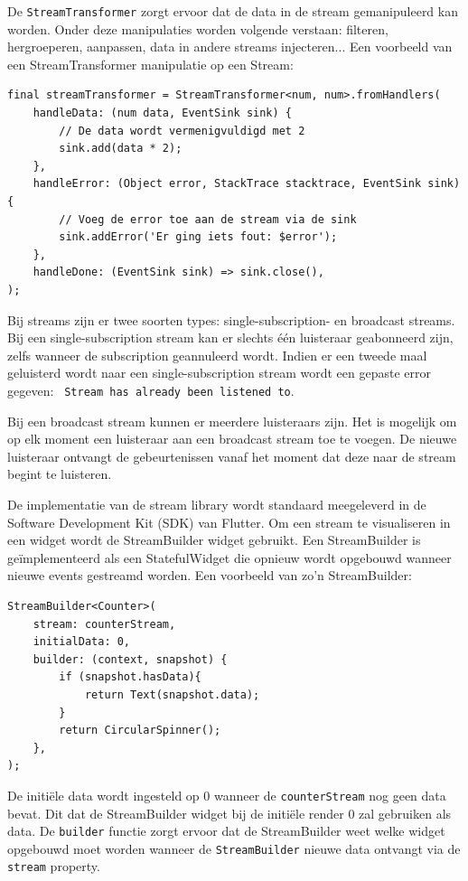 De \verb|StreamTransformer| zorgt ervoor dat de data in de stream gemanipuleerd kan worden. Onder deze manipulaties worden volgende verstaan: filteren, hergroeperen, aanpassen, data in andere streams injecteren...
Een voorbeeld van een StreamTransformer manipulatie op een Stream:
 \begin{verbatim}
final streamTransformer = StreamTransformer<num, num>.fromHandlers(
    handleData: (num data, EventSink sink) {
        // De data wordt vermenigvuldigd met 2
        sink.add(data * 2);
    }, 
    handleError: (Object error, StackTrace stacktrace, EventSink sink) {
        // Voeg de error toe aan de stream via de sink
        sink.addError('Er ging iets fout: $error');
    }, 
    handleDone: (EventSink sink) => sink.close(),
);
\end{verbatim}

Bij streams zijn er twee soorten types: single-subscription- en broadcast streams. Bij een single-subscription stream kan er slechts één luisteraar geabonneerd zijn, zelfs wanneer de subscription geannuleerd wordt. Indien er een tweede maal geluisterd wordt naar een single-subscription stream wordt een gepaste error gegeven: \verb| Stream has already been listened to|.

Bij een broadcast stream kunnen er meerdere luisteraars zijn. Het is mogelijk om op elk moment een luisteraar aan een broadcast stream toe te voegen. De nieuwe luisteraar ontvangt de gebeurtenissen vanaf het moment dat deze naar de stream begint te luisteren.

De implementatie van de stream library wordt standaard meegeleverd in de Software Development Kit (SDK) van Flutter. Om een stream te visualiseren in een widget wordt de StreamBuilder widget gebruikt. Een StreamBuilder is geïmplementeerd als een StatefulWidget die opnieuw wordt opgebouwd wanneer nieuwe events gestreamd worden.
Een voorbeeld van zo'n StreamBuilder:
\begin{verbatim}
StreamBuilder<Counter>(
    stream: counterStream,
    initialData: 0,
    builder: (context, snapshot) {
        if (snapshot.hasData){
            return Text(snapshot.data);
        }
        return CircularSpinner();
    },
);
\end{verbatim}
De initiële data wordt ingesteld op 0 wanneer de \verb|counterStream| nog geen data bevat. Dit dat de StreamBuilder widget bij de initiële render 0 zal gebruiken als data. De \verb|builder| functie zorgt ervoor dat de StreamBuilder weet welke widget opgebouwd moet worden wanneer de \verb|StreamBuilder| nieuwe data ontvangt via de \verb|stream| property.

